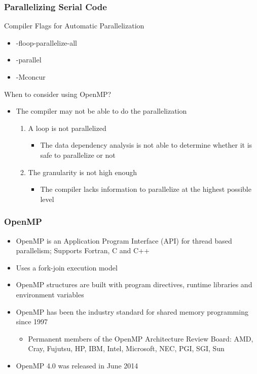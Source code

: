 \documentclass[10pt,t]{beamer}
\begin{document}
\begin{frame}
  \frametitle{Parallelizing Serial Code}
  \begin{exampleblock}{Compiler Flags for Automatic Parallelization}
    \begin{itemize}
      \item {} -floop-parallelize-all
      \item {} -parallel
      \item {} -Mconcur
    \end{itemize}
  \end{exampleblock}
  \begin{block}{When to consider using OpenMP?}
    \begin{itemize}
      \item The compiler may not be able to do the parallelization
      \begin{enumerate}
        \item A loop is not parallelized
        \begin{itemize}
          \item The data dependency analysis is not able to determine whether it is safe to parallelize or not
        \end{itemize}
        \item The granularity is not high enough
        \begin{itemize}
          \item The compiler lacks information to parallelize at the highest possible level
        \end{itemize}
      \end{enumerate}
    \end{itemize}
  \end{block}
\end{frame}

\begin{frame}
  \frametitle{OpenMP}
  \begin{block}{}
    \begin{itemize}
      \item OpenMP is an Application Program Interface (API) for thread based parallelism; Supports Fortran, C and C++
      \item Uses a fork-join execution model
      \item OpenMP structures are built with program directives, runtime libraries and environment variables
      \item OpenMP has been the industry standard for shared memory programming since 1997
      \begin{itemize}
        \item Permanent members of the OpenMP Architecture Review Board: AMD, Cray, Fujutsu, HP, IBM, Intel, Microsoft, NEC, PGI, SGI, Sun
      \end{itemize}
      \item OpenMP 4.0 was released in June 2014
    \end{itemize}
  \end{block}
\end{frame}
\end{document}
